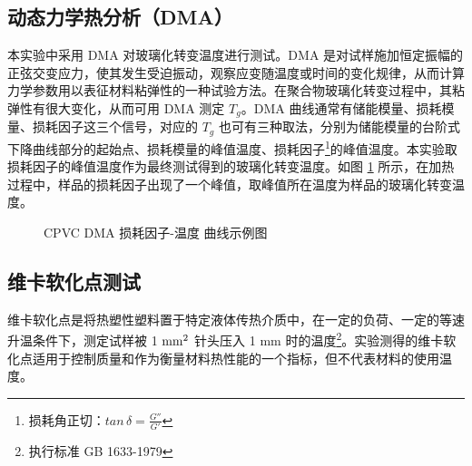 \subsection{动态力学热分析（DMA）}
本实验中采用 DMA 对玻璃化转变温度进行测试。DMA 是对试样施加恒定振幅的正弦交变应力，使其发生受迫振动，观察应变随温度或时间的变化规律，从而计算力学参数用以表征材料粘弹性的一种试验方法。在聚合物玻璃化转变过程中，其粘弹性有很大变化，从而可用 DMA 测定 $T_g$。DMA 曲线通常有储能模量、损耗模量、损耗因子这三个信号，对应的 $T_g$ 也可有三种取法，分别为储能模量的台阶式下降曲线部分的起始点、损耗模量的峰值温度、损耗因子\footnote{损耗角正切：$tan \, \delta = \frac{G''}{G'}$}的峰值温度。本实验取损耗因子的峰值温度作为最终测试得到的玻璃化转变温度。如图 \ref{figExTg} 所示，在加热过程中，样品的损耗因子出现了一个峰值，取峰值所在温度为样品的玻璃化转变温度。

\begin{figure}[!htb]
    \begin{center}
        
    \end{center}
    \caption{CPVC DMA 损耗因子-温度 曲线示例图}
    \label{figExTg}
\end{figure}

\subsection{维卡软化点测试}
维卡软化点是将热塑性塑料置于特定液体传热介质中，在一定的负荷、一定的等速升温条件下，测定试样被 1 $\rm{mm^2}$ 针头压入 1 mm 时的温度\footnote{执行标准 GB 1633-1979}。实验测得的维卡软化点适用于控制质量和作为衡量材料热性能的一个指标，但不代表材料的使用温度。